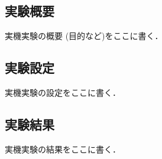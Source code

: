 \subsection{実験概要}
実機実験の概要 (目的など)をここに書く．

\subsection{実験設定}
実機実験の設定をここに書く．

\subsection{実験結果}
実機実験の結果をここに書く．